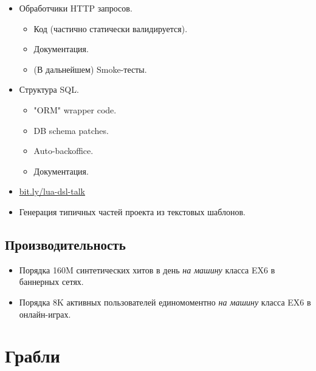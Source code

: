 \documentclass[aspectratio=169,handout,bigger]{beamer}
\begin{document}
\begin{frame}
  \begin{itemize}
    \item Обработчики HTTP запросов.
    \begin{itemize}
      \item Код (частично статически валидируется).
      \item Документация.
      \item (В дальнейшем) Smoke-тесты.
    \end{itemize}
    \item Структура SQL.
    \begin{itemize}
      \item "ORM" wrapper code.
      \item DB schema patches.
      \item Auto-backoffice.
      \item Документация.
    \end{itemize}
    \item \href{http://bit.ly/lua-dsl-talk}{bit.ly/lua-dsl-talk}
    \item Генерация типичных частей проекта из текстовых шаблонов.
  \end{itemize}
\end{frame}


\subsection*{Производительность}

\begin{frame}
  \begin{itemize}
    \item Порядка 160M синтетических хитов в день \emph{на машину} класса EX6 в баннерных сетях.
    \item Порядка 8K активных пользователей единомоментно \emph{на машину} класса EX6 в онлайн-играх.
  \end{itemize}
\end{frame}


\section{Грабли}
\end{document}
